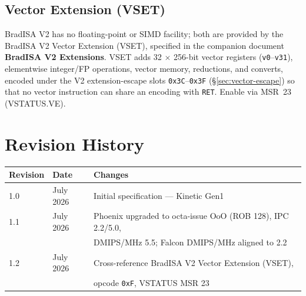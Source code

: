 \documentclass[11pt,a4paper]{article}
\begin{document}
\subsection{Vector Extension (VSET)}

BradISA V2 has no floating-point or SIMD facility; both are provided by the
BradISA V2 Vector Extension (VSET), specified in the companion document
\textbf{BradISA V2 Extensions}. VSET adds 32 $\times$ 256-bit vector
registers ({\tt v0}--{\tt v31}), elementwise integer/FP operations, vector
memory, reductions, and converts, encoded under the V2 extension-escape
slots {\tt 0x3C}--{\tt 0x3F} (\S\ref{sec:vector-escape}) so that no vector
instruction can share an encoding with {\tt RET}.
Enable via MSR~23 (VSTATUS.VE).

\newpage

\section*{Revision History}
\begin{tabular}{lll}
\toprule
Revision & Date & Changes \\
\midrule
1.0 & July 2026 & Initial specification --- Kinetic Gen1 \\
1.1 & July 2026 & Phoenix upgraded to octa-issue OoO (ROB 128), IPC 2.2/5.0, \\
    &           & DMIPS/MHz 5.5; Falcon DMIPS/MHz aligned to 2.2 \\
1.2 & July 2026 & Cross-reference BradISA V2 Vector Extension (VSET), \\
    &           & opcode {\tt 0xF}, VSTATUS MSR 23 \\
\bottomrule
\end{tabular}
\end{document}
